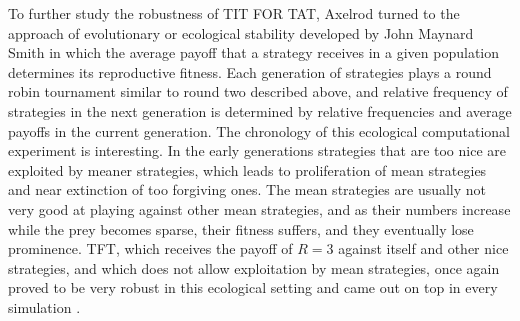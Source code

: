 To further study the robustness of TIT FOR TAT, Axelrod turned to the approach of evolutionary or ecological stability developed by John Maynard Smith in which the average payoff that a strategy receives in a given population determines its reproductive fitness. Each generation of strategies plays a round robin tournament similar to round two described above, and relative frequency of strategies in the next generation is determined by relative frequencies and average payoffs in the current generation. The chronology of this ecological computational experiment is interesting. In the early generations strategies that are too nice are exploited by meaner strategies, which leads to proliferation of mean strategies and near extinction of too forgiving ones. The mean strategies are usually not very good at playing against other mean strategies, and as their numbers increase while the prey becomes sparse, their fitness suffers, and they eventually lose prominence. TFT, which receives the payoff of $R = 3$ against itself and other nice strategies, and which does not allow exploitation by mean strategies, once again proved to be very robust in this ecological setting and came out on top in every simulation \cite[p.53]{axelrod1984evolution}.

